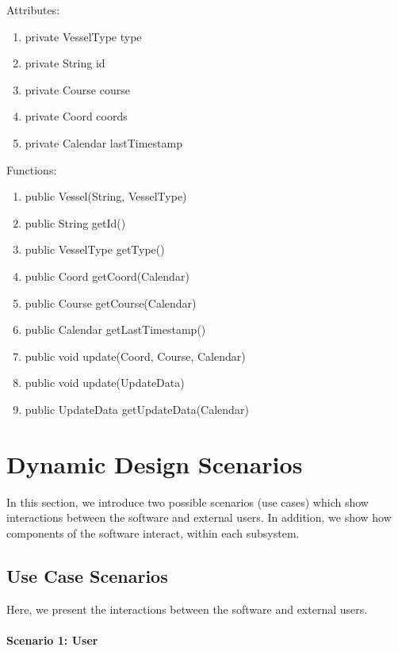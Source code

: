 \documentclass{article}
\begin{document}
Attributes:
\begin{enumerate}
	\item private VesselType type
    \item private String id
    \item private Course course
    \item private Coord coords
    \item private Calendar lastTimestamp
\end {enumerate}

\vspace{0.5cm}

Functions:
\begin{enumerate}
	\item public Vessel(String, VesselType)
	\item public String getId()
	\item public VesselType getType()
	\item public Coord getCoord(Calendar)
	\item public Course getCourse(Calendar)
	\item public Calendar getLastTimestamp()
	\item public void update(Coord, Course, Calendar)
	\item public void update(UpdateData)
	\item public UpdateData getUpdateData(Calendar)
\end{enumerate}

\section{Dynamic Design Scenarios} %

In this section, we introduce two possible scenarios (use cases) which show interactions between the software and external users. In addition, we show how components of the software interact, within each subsystem.

\subsection{Use Case Scenarios}

Here, we present the interactions between the software and external users.

\paragraph{Scenario 1: User}
\end{document}
